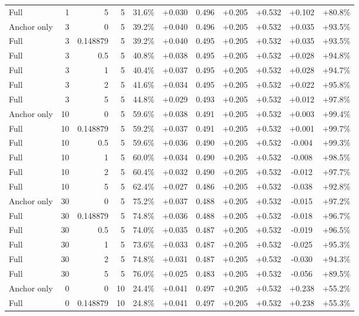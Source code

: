 \begin{table}[htbp]
\begin{tabular}{lrrrccccccc}
Full & 1 & 5 & 5 & 31.6\% & +0.030 & 0.496 & +0.205 & +0.532 & +0.102 & +80.8\% \\
Anchor only & 3 & 0 & 5 & 39.2\% & +0.040 & 0.496 & +0.205 & +0.532 & +0.035 & +93.5\% \\
Full & 3 & 0.148879 & 5 & 39.2\% & +0.040 & 0.495 & +0.205 & +0.532 & +0.035 & +93.5\% \\
Full & 3 & 0.5 & 5 & 40.8\% & +0.038 & 0.495 & +0.205 & +0.532 & +0.028 & +94.8\% \\
Full & 3 & 1 & 5 & 40.4\% & +0.037 & 0.495 & +0.205 & +0.532 & +0.028 & +94.7\% \\
Full & 3 & 2 & 5 & 41.6\% & +0.034 & 0.495 & +0.205 & +0.532 & +0.022 & +95.8\% \\
Full & 3 & 5 & 5 & 44.8\% & +0.029 & 0.493 & +0.205 & +0.532 & +0.012 & +97.8\% \\
Anchor only & 10 & 0 & 5 & 59.6\% & +0.038 & 0.491 & +0.205 & +0.532 & +0.003 & +99.4\% \\
Full & 10 & 0.148879 & 5 & 59.2\% & +0.037 & 0.491 & +0.205 & +0.532 & +0.001 & +99.7\% \\
Full & 10 & 0.5 & 5 & 59.6\% & +0.036 & 0.490 & +0.205 & +0.532 & -0.004 & +99.3\% \\
Full & 10 & 1 & 5 & 60.0\% & +0.034 & 0.490 & +0.205 & +0.532 & -0.008 & +98.5\% \\
Full & 10 & 2 & 5 & 60.4\% & +0.032 & 0.490 & +0.205 & +0.532 & -0.012 & +97.7\% \\
Full & 10 & 5 & 5 & 62.4\% & +0.027 & 0.486 & +0.205 & +0.532 & -0.038 & +92.8\% \\
Anchor only & 30 & 0 & 5 & 75.2\% & +0.037 & 0.488 & +0.205 & +0.532 & -0.015 & +97.2\% \\
Full & 30 & 0.148879 & 5 & 74.8\% & +0.036 & 0.488 & +0.205 & +0.532 & -0.018 & +96.7\% \\
Full & 30 & 0.5 & 5 & 74.0\% & +0.035 & 0.487 & +0.205 & +0.532 & -0.019 & +96.5\% \\
Full & 30 & 1 & 5 & 73.6\% & +0.033 & 0.487 & +0.205 & +0.532 & -0.025 & +95.3\% \\
Full & 30 & 2 & 5 & 74.8\% & +0.031 & 0.487 & +0.205 & +0.532 & -0.030 & +94.3\% \\
Full & 30 & 5 & 5 & 76.0\% & +0.025 & 0.483 & +0.205 & +0.532 & -0.056 & +89.5\% \\
Anchor only & 0 & 0 & 10 & 24.4\% & +0.041 & 0.497 & +0.205 & +0.532 & +0.238 & +55.2\% \\
Full & 0 & 0.148879 & 10 & 24.8\% & +0.041 & 0.497 & +0.205 & +0.532 & +0.238 & +55.3\% \\

\end{tabular}
\end{table}
